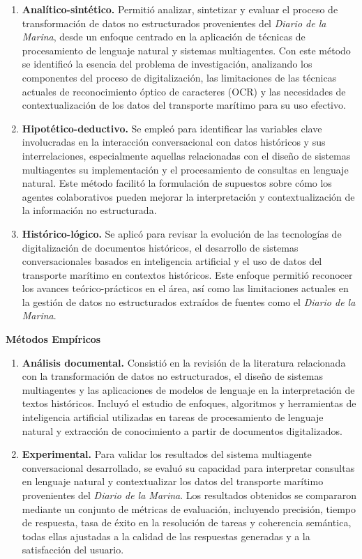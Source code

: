 \begin{enumerate}
	\item \textbf{Analítico-sintético.} Permitió analizar, sintetizar y evaluar el proceso de transformación de datos no estructurados provenientes del \textit{Diario de la Marina}, desde un enfoque centrado en la aplicación de técnicas de procesamiento de lenguaje natural y sistemas multiagentes. Con este método se identificó la esencia del problema de investigación, analizando los componentes del proceso de digitalización, las limitaciones de las técnicas actuales de reconocimiento óptico de caracteres (OCR) y las necesidades de contextualización de los datos del transporte marítimo para su uso efectivo.
	
	\item \textbf{Hipotético-deductivo.} Se empleó para identificar las variables clave involucradas en la interacción conversacional con datos históricos y sus interrelaciones, especialmente aquellas relacionadas con el diseño de sistemas multiagentes su implementación y el procesamiento de consultas en lenguaje natural. Este método facilitó la formulación de supuestos sobre cómo los agentes colaborativos pueden mejorar la interpretación y contextualización de la información no estructurada.
	
	\item \textbf{Histórico-lógico.} Se aplicó para revisar la evolución de las tecnologías de digitalización de documentos históricos, el desarrollo de sistemas conversacionales basados en inteligencia artificial y el uso de datos del transporte marítimo en contextos históricos. Este enfoque permitió reconocer los avances teórico-prácticos en el área, así como las limitaciones actuales en la gestión de datos no estructurados extraídos de fuentes como el \textit{Diario de la Marina}.
\end{enumerate}

\textbf{Métodos Empíricos}

\begin{enumerate}
	\item \textbf{Análisis documental.} Consistió en la revisión de la literatura relacionada con la transformación de datos no estructurados, el diseño de sistemas multiagentes y las aplicaciones de modelos de lenguaje en la interpretación de textos históricos. Incluyó el estudio de enfoques, algoritmos y herramientas de inteligencia artificial utilizadas en tareas de procesamiento de lenguaje natural y extracción de conocimiento a partir de documentos digitalizados.
	
	\item \textbf{Experimental.} Para validar los resultados del sistema multiagente conversacional desarrollado, se evaluó su capacidad para interpretar consultas en lenguaje natural y contextualizar los datos del transporte marítimo provenientes del \textit{Diario de la Marina}. Los resultados obtenidos se compararon mediante un conjunto de métricas de evaluación, incluyendo precisión, tiempo de respuesta, tasa de éxito en la resolución de tareas y coherencia semántica, todas ellas ajustadas a la calidad de las respuestas generadas y a la satisfacción del usuario.
\end{enumerate}

